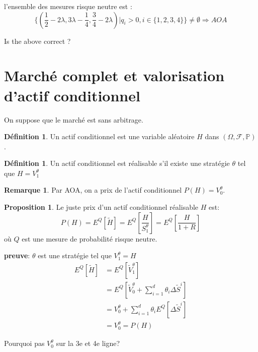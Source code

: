 \documentclass{article}
\theoremstyle{plain}
\theoremstyle{definition}
\newtheorem{defn}[thm]{D\'efinition}
\newtheorem{propos}[thm]{Proposition}
\newtheorem{remq}[thm]{Remarque}
\begin{document}
l'ensemble des mesures risque neutre est :
\begin{equation}
\{(\frac{1}{2}-2\lambda,3\lambda-\frac{1}{4},\frac{3}{4}-2\lambda)|q_i>0,i\in\{1,2,3,4\}\}\neq\emptyset \Rightarrow AOA
\end{equation}

{\color{red} Is the above correct ?}

\section{March\'e complet et valorisation d'actif conditionnel}

On suppose que le march\'e est sans arbitrage.

\begin{defn}
	Un actif conditionnel est une variable al\'eatoire $H$ dans $(\Omega, \mathcal{F}, \mathbb{P})$.
\end{defn}

\begin{defn}
	Un actif conditionnel est r\'ealisable s'il existe une strat\'egie $\theta$ tel que $H=V_1^\theta$
\end{defn}

\begin{remq}
	Par AOA, on a prix de l'actif conditionnel $P(H)=V_0^\theta$.
\end{remq}

\begin{propos}
	Le juste prix d'un actif conditionnel r\'ealisable $H$ est:
	\begin{equation}
	P(H) = E^Q[\tilde{H}]=E^Q[\frac{H}{S_1^\theta}]=E^Q[\frac{H}{1+R}]
	\end{equation}
	o\`u $Q$ est une mesure de probabilit\'e risque neutre.
\end{propos}


\textbf{preuve}: 
$\theta$ est une strat\'egie tel que $V_1^\theta=H$
\begin{equation}
\begin{split}
E^Q[\tilde{H}]&=E^Q[\tilde{V}_1^\theta]\\
&=E^Q[\tilde{V}_0^\theta+\sum_{i=1}^d \theta_i \Delta \tilde{S}^i]\\
&=V_0^\theta+\sum_{i=1}^d \theta_i E^Q[\Delta \tilde{S}^i]\\
&=V_0^\theta=P(H)
\end{split}
\end{equation}

{\color{red} Pourquoi pas $V_0^\theta$ sur la 3e et 4e ligne?}
\end{document}
